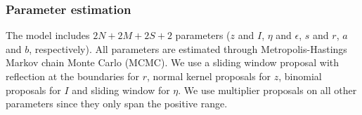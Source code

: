 \documentclass[12pt,letterpaper]{article}
\begin{document}
\subsubsection{Parameter estimation}
The model includes $2N + 2M + 2S + 2$ parameters ($z$ and $I$, $\eta$ and $\epsilon$, $s$ and $r$, $a$ and $b$, respectively). 
All parameters are estimated through Metropolis-Hastings Markov chain Monte Carlo (MCMC). We use a sliding window proposal with reflection at the boundaries for $r$, normal kernel proposals for $z$, binomial proposals for $I$ and sliding window for $\eta$. We use multiplier proposals on all other parameters since they only span the positive range. 
\end{document}
